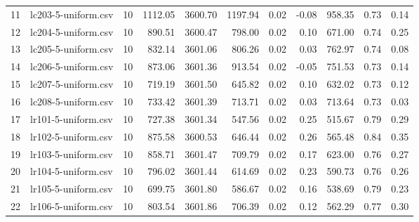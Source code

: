 \begin{tabular}{llrrrrrrrrr}
11 &   lc203-5-uniform.csv &         10 &          1112.05 &     3600.70 &            1197.94 &           0.02 &     -0.08 &              958.35 &            0.73 &       0.14 \\
12 &   lc204-5-uniform.csv &         10 &           890.51 &     3600.47 &             798.00 &           0.02 &      0.10 &              671.00 &            0.74 &       0.25 \\
13 &   lc205-5-uniform.csv &         10 &           832.14 &     3601.06 &             806.26 &           0.02 &      0.03 &              762.97 &            0.74 &       0.08 \\
14 &   lc206-5-uniform.csv &         10 &           873.06 &     3601.36 &             913.54 &           0.02 &     -0.05 &              751.53 &            0.73 &       0.14 \\
15 &   lc207-5-uniform.csv &         10 &           719.19 &     3601.50 &             645.82 &           0.02 &      0.10 &              632.02 &            0.73 &       0.12 \\
16 &   lc208-5-uniform.csv &         10 &           733.42 &     3601.39 &             713.71 &           0.02 &      0.03 &              713.64 &            0.73 &       0.03 \\
17 &   lr101-5-uniform.csv &         10 &           727.38 &     3601.34 &             547.56 &           0.02 &      0.25 &              515.67 &            0.79 &       0.29 \\
18 &   lr102-5-uniform.csv &         10 &           875.58 &     3600.53 &             646.44 &           0.02 &      0.26 &              565.48 &            0.84 &       0.35 \\
19 &   lr103-5-uniform.csv &         10 &           858.71 &     3601.47 &             709.79 &           0.02 &      0.17 &              623.00 &            0.76 &       0.27 \\
20 &   lr104-5-uniform.csv &         10 &           796.02 &     3601.44 &             614.69 &           0.02 &      0.23 &              590.73 &            0.76 &       0.26 \\
21 &   lr105-5-uniform.csv &         10 &           699.75 &     3601.80 &             586.67 &           0.02 &      0.16 &              538.69 &            0.79 &       0.23 \\
22 &   lr106-5-uniform.csv &         10 &           803.54 &     3601.86 &             706.39 &           0.02 &      0.12 &              562.29 &            0.77 &       0.30 \\

\end{tabular}
